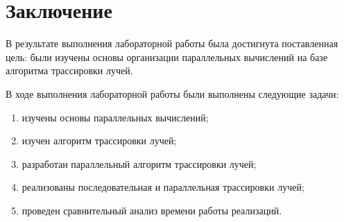 \chapter*{Заключение}

В результате выполнения лабораторной работы была достигнута поставленная цель: были изучены основы организации параллельных вычислений на базе алгоритма трассировки лучей.

В ходе выполнения лабораторной работы были выполнены следующие задачи: 
\begin{enumerate}[label={\arabic*)}]
	\item изучены основы параллельных вычислений;
	\item изучен алгоритм трассировки лучей;
	\item разработан параллельный алгоритм трассировки лучей;
	\item реализованы последовательная и параллельная трассировки лучей;
	\item проведен сравнительный анализ времени работы реализаций.
\end{enumerate}



